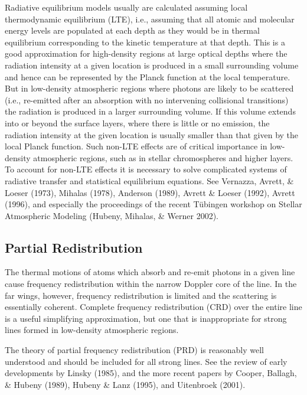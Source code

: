 \documentclass[11pt,twoside]{article}
\begin{document}
Radiative equilibrium models usually are calculated assuming local
thermodynamic equilibrium (LTE), i.e., assuming that all atomic and
molecular energy levels are populated at each depth as they would be in
thermal equilibrium corresponding to the kinetic temperature at that depth.
This is a good approximation for high-density regions at large optical
depths where the radiation intensity at a given location is produced in a
small surrounding volume and hence can be represented by the Planck
function at the local temperature.  But in low-density atmospheric regions
where photons are likely to be scattered (i.e., re-emitted after an
absorption with no intervening collisional transitions) the radiation is
produced in a larger surrounding volume.  If this volume extends into or
beyond the surface layers, where there is little or no emission, 
the radiation intensity at the given location
is usually smaller than that given by the local Planck function.
Such non-LTE effects are of critical importance
in low-density atmospheric regions, such as in stellar chromospheres and
higher layers.   To account for non-LTE effects it is necessary to solve 
complicated systems of radiative transfer and statistical equilibrium 
equations.  See Vernazza, Avrett, \& Loeser (1973), Mihalas (1978), 
Anderson (1989), Avrett \& Loeser (1992), Avrett (1996), and especially 
the proceedings of the recent T\"ubingen workshop on Stellar Atmospheric 
Modeling (Hubeny, Mihalas, \& Werner 2002).  

\subsection{Partial Redistribution}

The thermal motions of atoms which absorb and re-emit photons in a given
line cause frequency redistribution within the narrow Doppler core of the
line.  In the far wings, however, frequency redistribution is limited and the
scattering is essentially coherent.  Complete frequency redistribution (CRD)
over the entire line is a useful simplifying approximation, but one that is
inappropriate for strong lines formed in low-density atmospheric regions.

The theory of partial frequency redistribution (PRD) is reasonably well 
understood and should be included for all strong lines.  See the review of 
early developments by Linsky (1985), and the more recent papers by Cooper, 
Ballagh, \& Hubeny (1989), Hubeny \& Lanz (1995), and Uitenbroek (2001).
\end{document}
